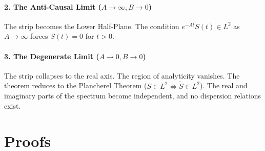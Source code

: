 \documentclass[a4paper,11pt]{article}
\theoremstyle{definition}
\begin{document}
\paragraph{2. The Anti-Causal Limit ($A \to \infty, B \to 0$)}
The strip becomes the Lower Half-Plane. The condition $e^{-At}S(t) \in L^2$ as $A \to \infty$ forces $S(t) = 0$ for $t>0$.

\paragraph{3. The Degenerate Limit ($A \to 0, B \to 0$)}
The strip collapses to the real axis. The region of analyticity vanishes. The theorem reduces to the Plancherel Theorem ($S \in L^2 \iff \tilde{S} \in L^2$). The real and imaginary parts of the spectrum become independent, and no dispersion relations exist.
\section{Proofs} 
\end{document}

